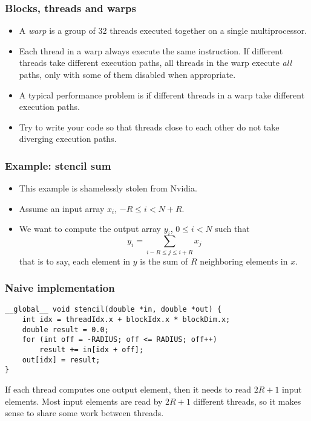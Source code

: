 \begin{frame}
  \frametitle{Blocks, threads and warps}
  \begin{itemize}
  \item A \emph{warp} is a group of 32 threads executed together on a single
    multiprocessor.
  \item Each thread in a warp always execute the same instruction. If different
    threads take different execution paths, all threads in the warp execute
    \emph{all} paths, only with some of them disabled when appropriate.
  \item A typical performance problem is if different threads in a warp take
    different execution paths.
  \item Try to write your code so that threads close to each other do not take
    diverging execution paths.
  \end{itemize}
\end{frame}

\begin{frame}
  \frametitle{Example: stencil sum}
  \begin{itemize}
  \item This example is shamelessly stolen from Nvidia.
  \item Assume an input array $x_i$, $-R \leq i < N+R$.
  \item We want to compute the output array $y_i$, $0 \leq i < N$ such that
    \[
      y_i = \sum_{i-R \leq j \leq i+R} x_j
    \]
    that is to say, each element in $y$ is the sum of $R$ neighboring elements
    in $x$.
  \end{itemize}
\end{frame}

\begin{frame}[fragile]
  \frametitle{Naive implementation}
  \begin{lstlisting}[style=cuda, basicstyle=\ttfamily\scriptsize]
__global__ void stencil(double *in, double *out) {
    int idx = threadIdx.x + blockIdx.x * blockDim.x;
    double result = 0.0;
    for (int off = -RADIUS; off <= RADIUS; off++)
        result += in[idx + off];
    out[idx] = result;
}
  \end{lstlisting}
  If each thread computes one output element, then it needs to read $2R+1$ input
  elements. Most input elements are read by $2R+1$ different threads, so it
  makes sense to share some work between threads.
\end{frame}

